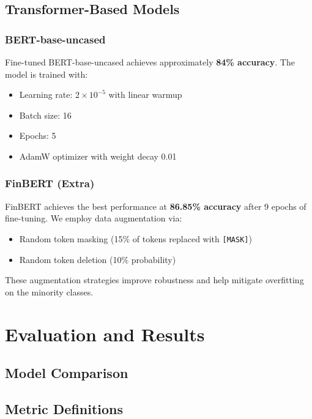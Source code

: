 \documentclass[11pt,a4paper]{article}
\begin{document}
\subsection{Transformer-Based Models}

\subsubsection{BERT-base-uncased}

Fine-tuned BERT-base-uncased achieves approximately \textbf{84\% accuracy}. The model is trained with:
\begin{itemize}[noitemsep]
    \item Learning rate: $2 \times 10^{-5}$ with linear warmup
    \item Batch size: 16
    \item Epochs: 5
    \item AdamW optimizer with weight decay 0.01
\end{itemize}

\subsubsection{FinBERT (Extra)}

FinBERT achieves the best performance at \textbf{86.85\% accuracy} after 9 epochs of fine-tuning. We employ data augmentation via:
\begin{itemize}[noitemsep]
    \item Random token masking (15\% of tokens replaced with \texttt{[MASK]})
    \item Random token deletion (10\% probability)
\end{itemize}

These augmentation strategies improve robustness and help mitigate overfitting on the minority classes.

\section{Evaluation and Results}

\subsection{Model Comparison}

\subsection{Metric Definitions}
\end{document}
